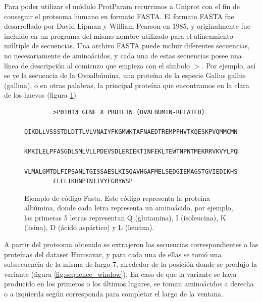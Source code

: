 Para poder utilizar el módulo ProtParam recurrimos a Uniprot con el fin de conseguir el proteoma humano en formato FASTA. El formato FASTA fue desarrollado por David Lipman y William Pearson en 1985, y originalmente fue incluido en un programa del mismo nombre utilizado para el alineamiento múltiple de secuencias. Una archivo FASTA puede incluir diferentes secuencias, no necesariamente de aminoácidos, y cada una de estas secuencias posee una línea de descripción al comienzo que empieza con el símbolo $>$. Por ejemplo, así se ve la secuencia de la Ovoalbúmina, una proteína de la especie Gallus gallus (gallina), o en otras palabras, la principal proteína que encontramos en la clara de los huevos (figura \ref{code:fasta_code})

\begin{figure}
    \begin{verbatim}
    	>P01013 GENE X PROTEIN (OVALBUMIN-RELATED)
    	QIKDLLVSSSTDLDTTLVLVNAIYFKGMWKTAFNAEDTREMPFHVTKQESKPVQMMCMNNSFNVATLPAE
    	KMKILELPFASGDLSMLVLLPDEVSDLERIEKTINFEKLTEWTNPNTMEKRRVKVYLPQMKIEEKYNLTS
    	VLMALGMTDLFIPSANLTGISSAESLKISQAVHGAFMELSEDGIEMAGSTGVIEDIKHSPESEQFRADHP
    	FLFLIKHNPTNTIVYFGRYWSP
    \end{verbatim}
\caption{Ejemplo de código Fasta. Este código representa la proteína albúmina, donde cada letra representa un aminoácido, por ejemplo, las primeras 5 letras representan Q (glutamina), I (isoleucina), K (lisina), D (ácido aspártico) y L (leucina).}
\label{code:fasta_code}

\end{figure}
\pagebreak

A partir del proteoma obtenido se extrajeron las secuencias correspondientes a las proteínas del dataset Humsavar, y para cada una de ellas se tomó una subsecuencia de la misma de largo 7, alrededor de la posición donde se produjo la variante (figura \ref{fig:sequence_window}). En caso de que la variante se haya producido en los primeros o los últimos lugares, se toman aminoácidos a derecha o a izquierda según corresponda para completar el largo de la ventana.



